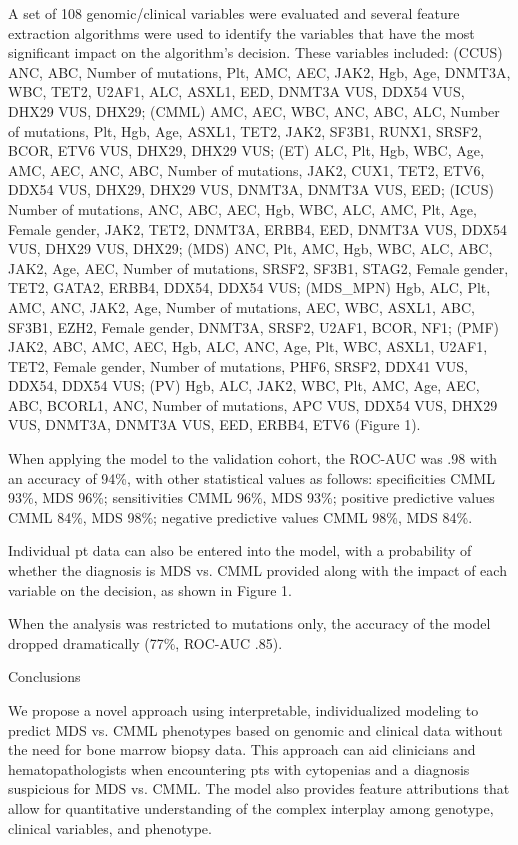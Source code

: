 A set of 108 genomic/clinical variables were evaluated and several feature extraction algorithms were used to identify the variables that have the most significant impact on the algorithm's decision. These variables included: (CCUS) ANC, ABC, Number of mutations, Plt, AMC, AEC, JAK2, Hgb, Age, DNMT3A, WBC, TET2, U2AF1, ALC, ASXL1, EED, DNMT3A VUS, DDX54 VUS, DHX29 VUS, DHX29; (CMML) AMC, AEC, WBC, ANC, ABC, ALC, Number of mutations, Plt, Hgb, Age, ASXL1, TET2, JAK2, SF3B1, RUNX1, SRSF2, BCOR, ETV6 VUS, DHX29, DHX29 VUS; (ET) ALC, Plt, Hgb, WBC, Age, AMC, AEC, ANC, ABC, Number of mutations, JAK2, CUX1, TET2, ETV6, DDX54 VUS, DHX29, DHX29 VUS, DNMT3A, DNMT3A VUS, EED; (ICUS) Number of mutations, ANC, ABC, AEC, Hgb, WBC, ALC, AMC, Plt, Age, Female gender, JAK2, TET2, DNMT3A, ERBB4, EED, DNMT3A VUS, DDX54 VUS, DHX29 VUS, DHX29; (MDS) ANC, Plt, AMC, Hgb, WBC, ALC, ABC, JAK2, Age, AEC, Number of mutations, SRSF2, SF3B1, STAG2, Female gender, TET2, GATA2, ERBB4, DDX54, DDX54 VUS; (MDS_MPN) Hgb, ALC, Plt, AMC, ANC, JAK2, Age, Number of mutations, AEC, WBC, ASXL1, ABC, SF3B1, EZH2, Female gender, DNMT3A, SRSF2, U2AF1, BCOR, NF1; (PMF) JAK2, ABC, AMC, AEC, Hgb, ALC, ANC, Age, Plt, WBC, ASXL1, U2AF1, TET2, Female gender, Number of mutations, PHF6, SRSF2, DDX41 VUS, DDX54, DDX54 VUS; (PV) Hgb, ALC, JAK2, WBC, Plt, AMC, Age, AEC, ABC, BCORL1, ANC, Number of mutations, APC VUS, DDX54 VUS, DHX29 VUS, DNMT3A, DNMT3A VUS, EED, ERBB4, ETV6 (Figure 1).

When applying the model to the validation cohort, the ROC-AUC was .98 with an accuracy of 94\%, with other statistical values as follows: specificities CMML 93\%, MDS 96\%; sensitivities CMML 96\%, MDS 93\%; positive predictive values CMML 84\%, MDS 98\%; negative predictive values CMML 98\%, MDS 84\%.

Individual pt data can also be entered into the model, with a probability of whether the diagnosis is MDS vs. CMML provided along with the impact of each variable on the decision, as shown in Figure 1.

When the analysis was restricted to mutations only, the accuracy of the model dropped dramatically (77\%, ROC-AUC .85).


Conclusions

We propose a novel approach using interpretable, individualized modeling to predict MDS vs. CMML phenotypes based on genomic and clinical data without the need for bone marrow biopsy data. This approach can aid clinicians and hematopathologists when encountering pts with cytopenias and a diagnosis suspicious for MDS vs. CMML. The model also provides feature attributions that allow for quantitative understanding of the complex interplay among genotype, clinical variables, and phenotype.


